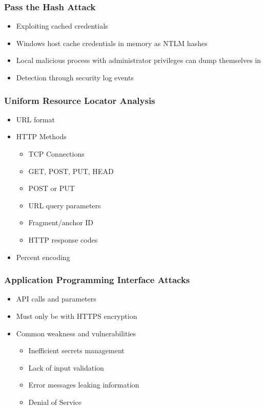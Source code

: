 		\subsubsection {Pass the Hash Attack}
			\begin{itemize}
				\item Exploiting cached credentials
				\item Windows host cache credentials in memory as NTLM hashes
				\item Local malicious process with administrator privileges can dump
					themselves in
				\item Detection through security log events
			\end{itemize}
		\subsubsection {Uniform Resource Locator Analysis}
			\begin{itemize}
				\item URL format
				\item HTTP Methods
					\begin{itemize}
						\item TCP Connections
						\item GET, POST, PUT, HEAD
						\item POST or PUT
						\item URL query parameters
						\item Fragment/anchor ID
						\item HTTP response codes
					\end{itemize}
				\item Percent encoding
			\end{itemize}
		\subsubsection {Application Programming Interface Attacks}
			\begin{itemize}
				\item API calls and parameters
				\item Must only be with HTTPS encryption
				\item Common weakness and vulnerabilities
					\begin{itemize}
						\item Inefficient secrets management
						\item Lack of input validation
						\item Error messages leaking information
						\item Denial of Service
					\end{itemize}
			\end{itemize}
